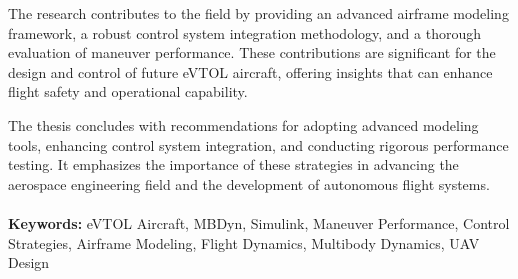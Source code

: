 \documentclass{Configuration_Files/PoliMi3i_thesis}
\begin{document}
The research contributes to the field by providing an advanced airframe modeling framework, a robust control system integration methodology, and a thorough evaluation of maneuver performance. These contributions are significant for the design and control of future eVTOL aircraft, offering insights that can enhance flight safety and operational capability.

The thesis concludes with recommendations for adopting advanced modeling tools, enhancing control system integration, and conducting rigorous performance testing. It emphasizes the importance of these strategies in advancing the aerospace engineering field and the development of autonomous flight systems.
\\
\\
\textbf{Keywords:} eVTOL Aircraft, MBDyn, Simulink, Maneuver Performance, Control Strategies, Airframe Modeling, Flight Dynamics, Multibody Dynamics, UAV Design



\end{document}
